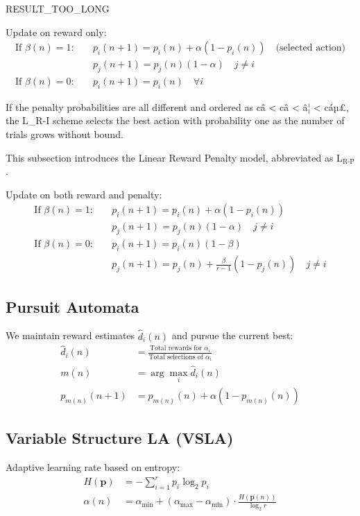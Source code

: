 \documentclass[11pt,a4paper]{article}
\begin{document}
\begin{itemize}
RESULT_TOO_LONG

Update on reward only:
\begin{align}
\text{If } \beta(n) = 1: \quad & p_i(n+1) = p_i(n) + \alpha(1 - p_i(n)) \quad \text{(selected action)} \\
& p_j(n+1) = p_j(n)(1 - \alpha) \quad j \neq i \\
\text{If } \beta(n) = 0: \quad & p_i(n+1) = p_i(n) \quad \forall i
\end{align}

If the penalty probabilities are all different and ordered as câ < câ < â¦ < cáµ£, the L_{R-I} scheme selects the best action with probability one as the number of trials grows without bound.

This subsection introduces the Linear Reward Penalty model, abbreviated as L$_{\text{R-P}}$.

Update on both reward and penalty:
\begin{align}
\text{If } \beta(n) = 1: \quad & p_i(n+1) = p_i(n) + \alpha(1 - p_i(n)) \\
& p_j(n+1) = p_j(n)(1 - \alpha) \quad j \neq i \\
\text{If } \beta(n) = 0: \quad & p_i(n+1) = p_i(n)(1 - \beta) \\
& p_j(n+1) = p_j(n) + \frac{\beta}{r-1}(1 - p_j(n)) \quad j \neq i
\end{align}

\subsection{Pursuit Automata}

We maintain reward estimates $\hat{d}_i(n)$ and pursue the current best:
\begin{align}
\hat{d}_i(n) &= \frac{\text{Total rewards for } \alpha_i}{\text{Total selections of } \alpha_i} \\
m(n) &= \arg\max_i \hat{d}_i(n) \\
p_{m(n)}(n+1) &= p_{m(n)}(n) + \alpha(1 - p_{m(n)}(n))
\end{align}

\subsection{Variable Structure LA (VSLA)}

Adaptive learning rate based on entropy:
\begin{align}
H(\mathbf{p}) &= -\sum_{i=1}^{r} p_i \log_2 p_i \\
\alpha(n) &= \alpha_{\min} + (\alpha_{\max} - \alpha_{\min}) \cdot \frac{H(\mathbf{p}(n))}{\log_2 r}
\end{align}


\end{itemize}
\end{document}
